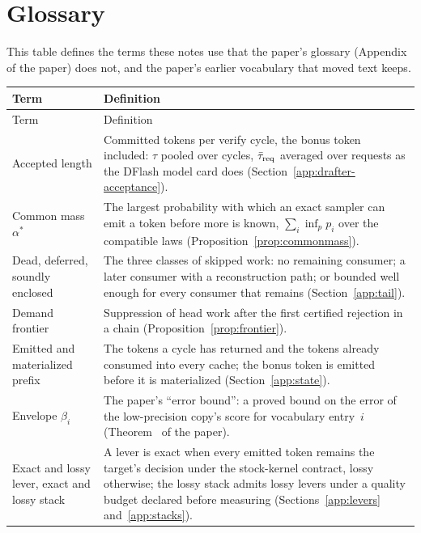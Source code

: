 \section{Glossary}\label{notes:glossary}
This table defines the terms these notes use that the paper's glossary (Appendix~ of the paper) does not, and the paper's earlier vocabulary that moved text keeps.

{\small
\begin{longtable}{@{}P{4.4cm}P{12.1cm}@{}}
\toprule Term & Definition\\\midrule\endfirsthead
\toprule Term & Definition\\\midrule\endhead
\bottomrule\endlastfoot
Accepted length & Committed tokens per verify cycle, the bonus token included: $\tau$ pooled over cycles, $\bar\tau_{\rm req}$ averaged over requests as the DFlash model card does (Section~\ref{app:drafter-acceptance}).\\
Common mass $\alpha^\ast$ & The largest probability with which an exact sampler can emit a token before more is known, $\sum_i\inf_pp_i$ over the compatible laws (Proposition~\ref{prop:commonmass}).\\
Dead, deferred, soundly enclosed & The three classes of skipped work: no remaining consumer; a later consumer with a reconstruction path; or bounded well enough for every consumer that remains (Section~\ref{app:tail}).\\
Demand frontier & Suppression of head work after the first certified rejection in a chain (Proposition~\ref{prop:frontier}).\\
Emitted and materialized prefix & The tokens a cycle has returned and the tokens already consumed into every cache; the bonus token is emitted before it is materialized (Section~\ref{app:state}).\\
Envelope $\beta_i$ & The paper's ``error bound'': a proved bound on the error of the low-precision copy's score for vocabulary entry~$i$ (Theorem~ of the paper).\\
Exact and lossy lever, exact and lossy stack & A lever is exact when every emitted token remains the target's decision under the stock-kernel contract, lossy otherwise; the lossy stack admits lossy levers under a quality budget declared before measuring (Sections~\ref{app:levers} and~\ref{app:stacks}).\\

\end{longtable}}
